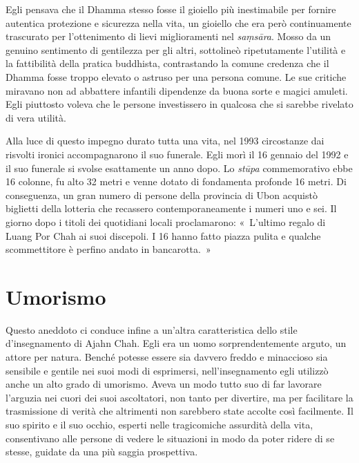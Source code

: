Egli pensava che il Dhamma stesso fosse il gioiello più inestimabile per
fornire autentica protezione e sicurezza nella vita, un gioiello che era
però continuamente trascurato per l'ottenimento di lievi miglioramenti
nel \emph{saṃsāra}. Mosso da un genuino sentimento di gentilezza per gli
altri, sottolineò ripetutamente l'utilità e la fattibilità della pratica
buddhista, contrastando la comune credenza che il Dhamma fosse troppo
elevato o astruso per una persona comune. Le sue critiche miravano non
ad abbattere infantili dipendenze da buona sorte e magici amuleti. Egli
piuttosto voleva che le persone investissero in qualcosa che si sarebbe
rivelato di vera utilità.

Alla luce di questo impegno durato tutta una vita, nel 1993 circostanze
dai risvolti ironici accompagnarono il suo funerale. Egli morì il 16
gennaio del 1992 e il suo funerale si svolse esattamente un anno dopo.
Lo \emph{stūpa} commemorativo ebbe 16 colonne, fu alto 32 metri e venne
dotato di fondamenta profonde 16 metri. Di conseguenza, un gran numero
di persone della provincia di Ubon acquistò biglietti della lotteria che
recassero contemporaneamente i numeri uno e sei. Il giorno dopo i titoli
dei quotidiani locali proclamarono: «~L'ultimo regalo di Luang Por Chah
ai suoi discepoli. I 16 hanno fatto piazza pulita e qualche
scommettitore è perfino andato in bancarotta.~»

\section{Umorismo}

Questo aneddoto ci conduce infine a un'altra caratteristica dello stile
d'insegnamento di Ajahn Chah. Egli era un uomo sorprendentemente arguto,
un attore per natura. Benché potesse essere sia davvero freddo e
minaccioso sia sensibile e gentile nei suoi modi di esprimersi,
nell'insegnamento egli utilizzò anche un alto grado di umorismo. Aveva
un modo tutto suo di far lavorare l'arguzia nei cuori dei suoi
ascoltatori, non tanto per divertire, ma per facilitare la trasmissione
di verità che altrimenti non sarebbero state accolte così facilmente. Il
suo spirito e il suo occhio, esperti nelle tragicomiche assurdità della
vita, consentivano alle persone di vedere le situazioni in modo da poter
ridere di se stesse, guidate da una più saggia prospettiva.


